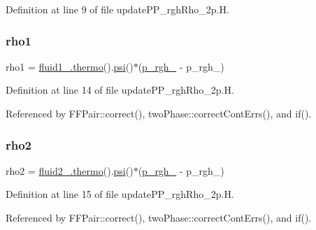 Definition at line 9 of file update\+P\+P\+\_\+rgh\+Rho\+\_\+2p.\+H.

\mbox{\label{updatePP__rghRho__2p_8H_afa544c227ef35756c30d930109636746}} 
\subsubsection{\texorpdfstring{rho1}{rho1}}
{\footnotesize\ttfamily rho1 = \hyperlink{EEqns__2p_8H_a9d615e711281a88a96c648787c7dbd32}{fluid1\+\_\+.\+thermo}().\hyperlink{UEqn__1pl_8H_a165a34deec3ee505598e511a88831968}{psi}()$\ast$(\hyperlink{updatePP__rghRho__2p_8H_a320090d1a3c1675778a59e981765c77c}{p\+\_\+rgh\+\_\+} -\/ p\+\_\+rgh\+\_)}



Definition at line 14 of file update\+P\+P\+\_\+rgh\+Rho\+\_\+2p.\+H.



Referenced by F\+F\+Pair\+::correct(), two\+Phase\+::correct\+Cont\+Errs(), and if().

\mbox{\label{updatePP__rghRho__2p_8H_a2d51a71532ef998d68124773484e966c}} 
\subsubsection{\texorpdfstring{rho2}{rho2}}
{\footnotesize\ttfamily rho2 = \hyperlink{EEqns__2p_8H_a9d615e711281a88a96c648787c7dbd32}{fluid2\+\_\+.\+thermo}().\hyperlink{UEqn__1pl_8H_a165a34deec3ee505598e511a88831968}{psi}()$\ast$(\hyperlink{updatePP__rghRho__2p_8H_a320090d1a3c1675778a59e981765c77c}{p\+\_\+rgh\+\_\+} -\/ p\+\_\+rgh\+\_)}



Definition at line 15 of file update\+P\+P\+\_\+rgh\+Rho\+\_\+2p.\+H.



Referenced by F\+F\+Pair\+::correct(), two\+Phase\+::correct\+Cont\+Errs(), and if().

\mbox{\label{updatePP__rghRho__2p_8H_ad9bea30ee8a23ee1c8b9d638756b1588}} 
